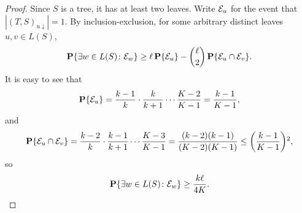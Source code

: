 \begin{proof}
  Since $S$ is a tree, it has at least two leaves. Write $\mathcal{E}_u$ for
  the event that $|(T, S)_{u \downarrow}| = 1$. By
  inclusion-exclusion, for some arbitrary distinct leaves
  $u, v \in L(S)$,
  \begin{align*}
    \operatorname{\mathbf{P}}\{\exists w \in L(S) \colon \mathcal{E}_w\} \ge \ell \operatorname{\mathbf{P}}\{\mathcal{E}_u\} - \binom{\ell}{2} \operatorname{\mathbf{P}}\{\mathcal{E}_u \cap \mathcal{E}_v\} .
  \end{align*}
  It is easy to see that
  \[
    \operatorname{\mathbf{P}}\{\mathcal{E}_u\} = \frac{k - 1}{k} \cdot \frac{k}{k + 1} \cdots \frac{K - 2}{K - 1} = \frac{k - 1}{K - 1} ,
  \]
  and
  \[
    \Pr\{\sE_u \cap \sE_v\} = \frac{k - 2}{k} \cdot \frac{k - 1}{k + 1} \cdots \frac{K - 3}{K - 1} = \frac{(k - 2)(k - 1)}{(K - 2)(K - 1)} \le \left( \frac{k - 1}{K - 1} \right)^2 ,
  \]
  so
  \[
    \operatorname{\mathbf{P}}\{\exists w \in L(S) \colon \mathcal{E}_w\} \ge \frac{k \ell}{4 K} . \qedhere
  \]
\end{proof}

